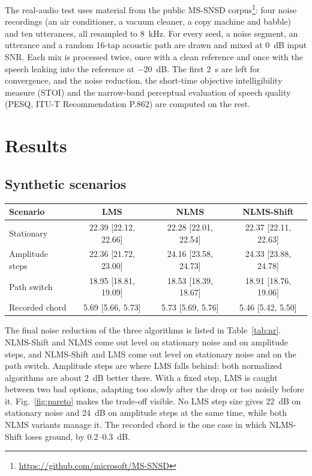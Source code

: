 The real-audio test uses material from the public MS-SNSD
corpus\footnote{\url{https://github.com/microsoft/MS-SNSD}}: four noise recordings (an air conditioner, a
vacuum cleaner, a copy machine and babble) and ten utterances, all resampled to 8~kHz. For every seed, a
noise segment, an utterance and a random 16-tap acoustic path are drawn and mixed at 0~dB input SNR. Each
mix is processed twice, once with a clean reference and once with the speech leaking into the reference
at $-20$~dB. The first 2~s are left for convergence, and the noise reduction, the short-time objective
intelligibility measure (STOI) and the narrow-band perceptual evaluation of speech quality (PESQ, ITU-T
Recommendation P.862) are computed on the rest.

\section{Results}\label{sec:results}
\subsection{Synthetic scenarios}
\begin{\WT}[!htbp]\centering\small
\caption{Final noise reduction, dB, mean [95\% CI] over seeds 1--20, $W=12$, $L=32$.}\label{tab:nr}
\begin{tabular}{lccc}\toprule
Scenario & LMS & NLMS & NLMS-Shift\\\midrule
Stationary   & 22.39 [22.12, 22.66] & 22.28 [22.01, 22.54] & 22.37 [22.11, 22.63]\\
Amplitude steps & 22.36 [21.72, 23.00] & 24.16 [23.58, 24.73] & 24.33 [23.88, 24.78]\\
Path switch  & 18.95 [18.81, 19.09] & 18.53 [18.39, 18.67] & 18.91 [18.76, 19.06]\\
Recorded chord & 5.69 [5.66, 5.73] & 5.73 [5.69, 5.76] & 5.46 [5.42, 5.50]\\\bottomrule
\end{tabular}
\end{\WT}
The final noise reduction of the three algorithms is listed in Table~\ref{tab:nr}. NLMS-Shift and NLMS
come out level on stationary noise and on amplitude steps, and NLMS-Shift and LMS come out level on
stationary noise and on the path switch. Amplitude steps are where LMS falls behind: both normalized
algorithms are about 2~dB better there. With a fixed step, LMS is caught between two bad options,
adapting too slowly after the drop or too noisily before it. Fig.~\ref{fig:pareto} makes the trade-off
visible. No LMS step size gives 22~dB on stationary noise and 24~dB on amplitude steps at the same time,
while both NLMS variants manage it. The recorded chord is the one case in which NLMS-Shift loses ground,
by 0.2--0.3~dB.

